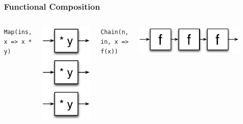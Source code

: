 \documentclass[xcolor=pdflatex,dvipsnames,table]{beamer}
\begin{document}
\begin{frame}
\frametitle{Functional Composition}


\begin{Large}
\begin{columns}

\verb+Map(ins, x => x * y)+ \\
\begin{center}
\includegraphics[height=0.6\textheight]{figs/map.pdf} \\[2cm]
\end{center}

\vskip2mm
\verb+Chain(n, in, x => f(x))+ \\
\begin{center}
\includegraphics[width=0.9\textwidth]{figs/chain.pdf} \\
\end{center}


\end{columns}
\end{Large}
\end{frame}
\end{document}
